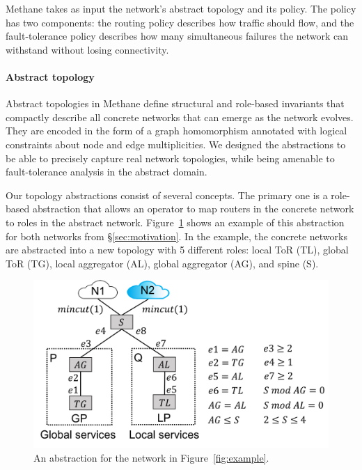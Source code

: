 \documentclass[numbers, 10pt, preprint]{sigplanconf}
\newcommand{\sysname}{{\small \sf Methane}\xspace}
\newcommand{\para}[1]{\paragraph*{\textbf{#1}}}
\begin{document}

\sysname takes as input the network's abstract topology and its policy. The policy has two components: the routing policy describes how traffic should flow, and the fault-tolerance policy describes how many simultaneous failures the network can withstand without losing connectivity.

\para{Abstract topology}
Abstract topologies in \sysname define structural and role-based invariants that compactly describe all concrete networks that can emerge as the network evolves. They are encoded in the form of a graph homomorphism annotated with logical constraints about node and edge multiplicities.
%
We designed the abstractions to be able to precisely capture real network topologies, while being amenable to fault-tolerance analysis in the abstract domain.


Our topology abstractions consist of several concepts.
The primary one is a role-based abstraction that allows an operator to map routers in the concrete network to roles in the abstract network. Figure~\ref{fig:example3} shows an example of this abstraction for both networks from \S\ref{sec:motivation}. In the example, the concrete networks are abstracted into a new topology with 5 different roles: local ToR (TL), global ToR (TG), local aggregator (AL), global aggregator (AG), and spine (S).

\begin{figure}[t!]
  \centering
  \includegraphics[width=\columnwidth]{figures/example3}
  \vspace{-2em}
  \caption{An abstraction for the network in Figure~\ref{fig:example}.}
  \label{fig:example3}
  \vspace{-1em}
\end{figure}
\end{document}
